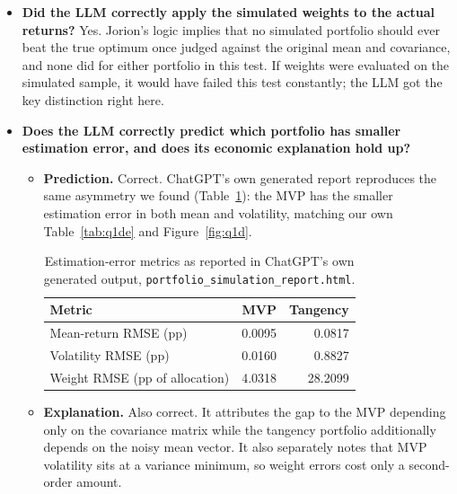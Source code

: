\documentclass[11pt]{article}
\begin{document}
\begin{itemize}
A small data analysis difference: it re-factorizes the covariance matrix on
every draw rather than reusing a single Cholesky factor, which is correct but
slower.

\item \textbf{Did the LLM correctly apply the simulated weights to the actual
returns?} Yes. Jorion's logic implies that no simulated portfolio should ever
beat the true optimum once judged against the original mean and covariance,
and none did for either portfolio in this test. If weights were evaluated on
the simulated sample, it would have failed this test constantly; the LLM got
the key distinction right here.

\item \textbf{Does the LLM correctly predict which portfolio has smaller
estimation error, and does its economic explanation hold up?}
\begin{itemize}
\item \textbf{Prediction.} Correct. ChatGPT's own generated report reproduces
the same asymmetry we found (Table~\ref{tab:llm_output}): the MVP has the
smaller estimation error in both mean and volatility, matching our own
Table~\ref{tab:q1de} and Figure~\ref{fig:q1d}.

\begin{table}[H]
\centering
\caption{Estimation-error metrics as reported in ChatGPT's own generated
output, \texttt{portfolio\_simulation\_report.html}.}
\begin{tabular}{lrr}
\toprule
Metric & MVP & Tangency \\
\midrule
Mean-return RMSE (pp) & 0.0095 & 0.0817 \\
Volatility RMSE (pp) & 0.0160 & 0.8827 \\
Weight RMSE (pp of allocation) & 4.0318 & 28.2099 \\
\bottomrule
\end{tabular}
\label{tab:llm_output}
\end{table}

\item \textbf{Explanation.} Also correct. It attributes the gap to the MVP
depending only on the covariance matrix while the tangency portfolio
additionally depends on the noisy mean vector. It also separately notes that
MVP volatility sits at a variance minimum, so weight errors cost only a
second-order amount.
\end{itemize}

\end{itemize}
\end{document}

